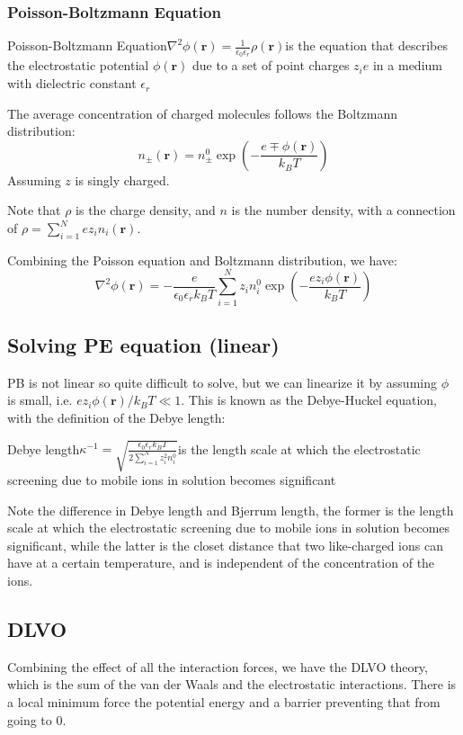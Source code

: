 \documentclass[12pt,a4paper]{article}
\begin{document}
\subsubsection{Poisson-Boltzmann Equation}
\begin{definition}
    {Poisson-Boltzmann Equation}{$\nabla^2 \phi(\mathbf{r})=\frac{1}{\epsilon_0 \epsilon_r} \rho(\mathbf{r})$}{is the equation that describes the electrostatic potential $\phi(\mathbf{r})$ due to a set of point charges $z_i e$ in a medium with dielectric constant $\epsilon_r$}
\end{definition}
The average concentration of charged molecules follows the Boltzmann distribution:
$$
n_{\pm}(\mathbf{r})=n_{\pm}^{0} \exp \left(-\frac{ e {\mp}\phi(\mathbf{r})}{k_{B} T}\right)
$$
Assuming $z$ is singly charged.

Note that $\rho$ is the charge density, and $n$ is the number density, with a connection of $\rho = \sum_{i=1}^{N} e z_{i} n_{i}(\mathbf{r}) $.

Combining the Poisson equation and Boltzmann distribution, we have:
$$
\nabla^{2} \phi(\mathbf{r})=-\frac{e}{\epsilon_{0} \epsilon_{r} k_{B} T} \sum_{i=1}^{N} z_{i} n_{i}^{0} \exp \left(-\frac{e z_{i} \phi(\mathbf{r})}{k_{B} T}\right)
$$
\subsection{Solving PE equation (linear)}
PB is not linear so quite difficult to solve, but we can linearize it by assuming $\phi$ is small, i.e. $e z_{i} \phi(\mathbf{r}) / k_{B} T \ll 1$.
This is known as the Debye-Huckel equation, with the definition of the Debye length:

\begin{definition}
    {Debye length}{$\kappa^{-1}=\sqrt{\frac{\epsilon_{0} \epsilon_{r} k_{B} T}{2 \sum_{i=1}^{N} z_{i}^{2} n_{i}^{0}}}$}{is the length scale at which the electrostatic screening due to mobile ions in solution becomes significant}
\end{definition}
Note the difference in Debye length and Bjerrum length, the former is the length scale at which the electrostatic screening due to mobile ions in solution becomes significant, while the latter is the closet distance that two like-charged ions can have at a certain temperature, and is independent of the concentration of the ions.
\subsection{DLVO}
Combining the effect of all the interaction forces, we have the DLVO theory, which is the sum of the van der Waals and the electrostatic interactions. There is a local minimum force the potential energy and a barrier preventing that from going to 0.
\end{document}
